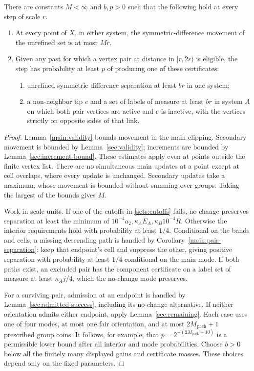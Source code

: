 \begin{proposition}\label{pad:success}
There are constants $M<\infty$ and $b,p>0$ such that the following hold
at every step of scale $r$.
\begin{enumerate}[label=(\roman*)]
\item At every point of $X$, in either system, the symmetric-difference
movement of the unrefined set is at most $Mr$.
\item Given any past for which a vertex pair at distance in $[r,2r)$ is
eligible, the step has probability at least $p$ of producing one of these
certificates:
\begin{enumerate}[label=(\alph*)]
\item unrefined symmetric-difference separation at least $br$ in one
system;
\item a non-neighbor tip $e$ and a set of labels of measure at least $br$
in system $A$ on which both pair vertices are active and $e$ is inactive,
with the vertices strictly on opposite sides of that link.
\end{enumerate}
\end{enumerate}
\end{proposition}
\begin{proof}
Lemma~\ref{main:validity} bounds movement in the main clipping.
Secondary movement is bounded by Lemma~\ref{sec:validity}; increments are bounded by
Lemma~\ref{sec:increment-bound}. These estimates apply even at points
outside the finite vertex list. There are no simultaneous main updates
at a point except at cell overlaps, where every update is unchanged.
Secondary updates take a maximum, whose movement is bounded without
summing over groups. Taking the largest of the bounds gives $M$.

Work in scale units. If one of the cutoffs in
\eqref{sets:cutoffs} fails, no change preserves separation at least the
minimum of $10^{-4}a_2,\kappa_AE_A,\kappa_B10^{-4}R$.
Otherwise the interior requirements hold with probability at least $1/4$.
Conditional on the bands and cells, a missing descending path is handled
by Corollary~\ref{main:pair-separation}: keep that endpoint's cell and suppress the other,
giving positive separation with probability at least $1/4$ conditional
on the main mode. If both paths exist, an excluded pair has the component
certificate on a label set of measure at least $\kappa_Aj/4$, which the
no-change mode preserves.

For a surviving pair, admission at an endpoint is handled by
Lemma~\ref{sec:admitted-success}, including its no-change alternative.
If neither orientation admits either endpoint, apply
Lemma~\ref{sec:remaining}. Each case uses one of four modes, at most one
fair orientation, and at most $2M_{\mathrm{pack}}+1$ prescribed group coins. It follows,
for example, that $p=2^{-(2M_{\mathrm{pack}}+10)}$ is a permissible lower bound after
all interior and mode probabilities. Choose $b>0$ below all the finitely
many displayed gains and certificate masses. These choices depend only
on the fixed parameters.
\end{proof}


